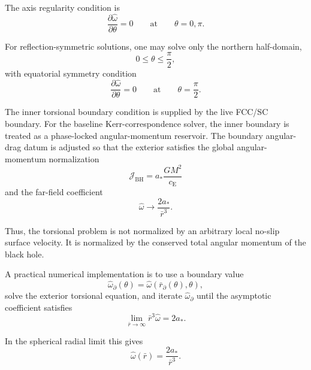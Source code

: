 The axis regularity condition is
\begin{equation}
    \boxed{ \frac{\partial\widehat{\omega}}{\partial\theta}=0 \qquad \text{at} \qquad \theta=0,\pi. }
\end{equation}

For reflection-symmetric solutions, one may solve only the northern half-domain,
\begin{equation}
    0\leq\theta\leq\frac{\pi}{2},
\end{equation}
with equatorial symmetry condition
\begin{equation}
    \boxed{ \frac{\partial\widehat{\omega}}{\partial\theta}=0 \qquad \text{at} \qquad \theta=\frac{\pi}{2}. }
\end{equation}

The inner torsional boundary condition is supplied by the live FCC/SC boundary. For the baseline Kerr-correspondence solver, the inner boundary is treated as a phase-locked angular-momentum reservoir. The boundary angular-drag datum is adjusted so that the exterior satisfies the global angular-momentum normalization
\begin{equation}
    \mathcal{J}_{\mathrm{BH}} = a_\ast\frac{GM^2}{c_{\mathrm{E}}}
\end{equation}
and the far-field coefficient
\begin{equation}
    \widehat{\omega} \rightarrow \frac{2a_\ast}{\bar{r}^3}.
\end{equation}

Thus, the torsional problem is not normalized by an arbitrary local no-slip surface velocity. It is normalized by the conserved total angular momentum of the black hole.

A practical numerical implementation is to use a boundary value
\begin{equation}
    \widehat{\omega}_{\partial}(\theta) = \widehat{\omega}(\bar{r}_{\partial}(\theta),\theta),
\end{equation}
solve the exterior torsional equation, and iterate $\widehat{\omega}_{\partial}$ until the asymptotic coefficient satisfies
\begin{equation}
    \boxed{ \lim_{\bar{r}\rightarrow\infty} \bar{r}^3\widehat{\omega} = 2a_\ast. }
\end{equation}

In the spherical radial limit this gives
\begin{equation}
    \widehat{\omega}(\bar{r}) = \frac{2a_\ast}{\bar{r}^3}.
\end{equation}

